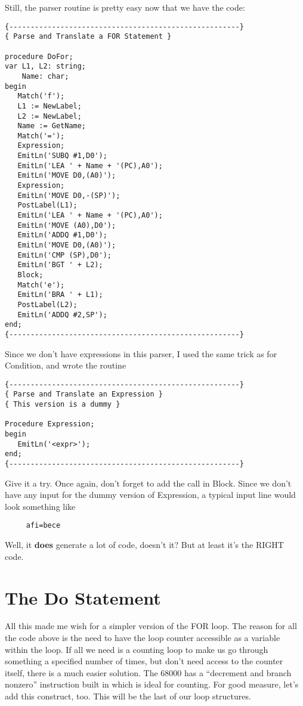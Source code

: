 Still, the parser  routine  is  pretty  easy now that we have the code:

\begin{verbatim}
{------------------------------------------------------}
{ Parse and Translate a FOR Statement }

procedure DoFor;
var L1, L2: string;
    Name: char;
begin
   Match('f');
   L1 := NewLabel;
   L2 := NewLabel;
   Name := GetName;
   Match('=');
   Expression;
   EmitLn('SUBQ #1,D0');
   EmitLn('LEA ' + Name + '(PC),A0');
   EmitLn('MOVE D0,(A0)');
   Expression;
   EmitLn('MOVE D0,-(SP)');
   PostLabel(L1);
   EmitLn('LEA ' + Name + '(PC),A0');
   EmitLn('MOVE (A0),D0');
   EmitLn('ADDQ #1,D0');
   EmitLn('MOVE D0,(A0)');
   EmitLn('CMP (SP),D0');
   EmitLn('BGT ' + L2);
   Block;
   Match('e');
   EmitLn('BRA ' + L1);
   PostLabel(L2);
   EmitLn('ADDQ #2,SP');
end;
{------------------------------------------------------}
\end{verbatim}

Since we don't have  expressions  in this parser, I used the same trick as for Condition, and wrote the routine

\begin{verbatim}
{------------------------------------------------------}
{ Parse and Translate an Expression }
{ This version is a dummy }

Procedure Expression;
begin
   EmitLn('<expr>');
end;
{------------------------------------------------------}
\end{verbatim}

Give it a try. Once again, don't  forget  to  add  the  call in Block. Since  we don't have any input for the dummy version of Expression, a typical input line would look something like

\begin{verbatim}
     afi=bece
\end{verbatim}

Well, it {\bfseries does} generate a lot of code, doesn't it?    But at least it's the RIGHT code.

\section{The Do Statement}

All this made me wish for a simpler version of the FOR loop. The reason for all the code  above  is  the  need  to  have  the loop counter accessible as a variable within the loop. If all we need is a counting loop to make us go through  something  a  specified number of times, but  don't  need  access  to the counter itself, there is a much easier solution. The 68000 has a  ``decrement and branch nonzero'' instruction built in which is ideal for counting. For good measure, let's add this construct, too. This  will  be the last of our loop structures.

